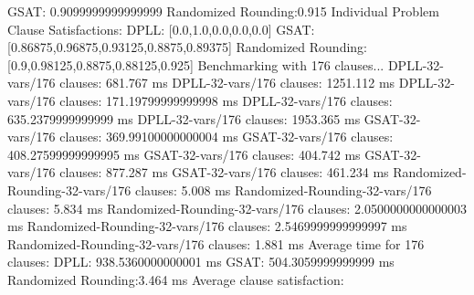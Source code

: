 \documentclass{article}
\begin{document}
  GSAT:               0.9099999999999999\newline
  Randomized Rounding:0.915\newline
\newline
Individual Problem Clause Satisfactions:\newline
  DPLL:               [0.0,1.0,0.0,0.0,0.0]\newline
  GSAT:               [0.86875,0.96875,0.93125,0.8875,0.89375]\newline
  Randomized Rounding:[0.9,0.98125,0.8875,0.88125,0.925]\newline
\newline
\newline
Benchmarking with 176 clauses...\newline
DPLL-32-vars/176 clauses: 681.767 ms\newline
DPLL-32-vars/176 clauses: 1251.112 ms\newline
DPLL-32-vars/176 clauses: 171.19799999999998 ms\newline
DPLL-32-vars/176 clauses: 635.2379999999999 ms\newline
DPLL-32-vars/176 clauses: 1953.365 ms\newline
GSAT-32-vars/176 clauses: 369.99100000000004 ms\newline
GSAT-32-vars/176 clauses: 408.27599999999995 ms\newline
GSAT-32-vars/176 clauses: 404.742 ms\newline
GSAT-32-vars/176 clauses: 877.287 ms\newline
GSAT-32-vars/176 clauses: 461.234 ms\newline
Randomized-Rounding-32-vars/176 clauses: 5.008 ms\newline
Randomized-Rounding-32-vars/176 clauses: 5.834 ms\newline
Randomized-Rounding-32-vars/176 clauses: 2.0500000000000003 ms\newline
Randomized-Rounding-32-vars/176 clauses: 2.5469999999999997 ms\newline
Randomized-Rounding-32-vars/176 clauses: 1.881 ms\newline
Average time for 176 clauses:\newline
  DPLL:               938.5360000000001 ms\newline
  GSAT:               504.3059999999999 ms\newline
  Randomized Rounding:3.464 ms\newline
Average clause satisfaction:\newline
\end{document}
